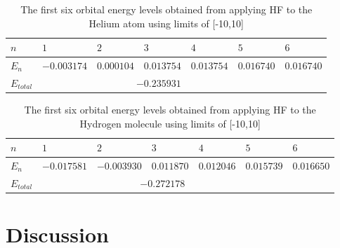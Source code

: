 \documentclass[10pt, oneside, letterpaper]{article}
\begin{document}
\begin{table}[H]
\begin{center}
\begin{tabular}{l|llllll}\hline
$n$    & $1$    & $2$     & $3$     & $4$      & $5$      & $6$      \\\hline
$E_n$  & $-0.003174$  & $0.000104$  & $0.013754$  & $0.013754$  & $0.016740$  & $0.016740$ \\\hline
$E_{total}$ & \multicolumn{5}{c}{$-0.235931$} \\\hline
\end{tabular}
\end{center}
  \caption{The first six orbital energy levels obtained from applying HF to the Helium atom using limits of [-10,10]}
  \label{orbital-energies-he-l10}
\end{table}

\begin{table}[H]
\begin{center}
\begin{tabular}{l|llllll}\hline
$n$    & $1$    & $2$     & $3$     & $4$      & $5$      & $6$      \\\hline
$E_n$  & $-0.017581$  & $-0.003930$  & $0.011870$  & $0.012046$  & $0.015739$  & $0.016650$ \\\hline
$E_{total}$ & \multicolumn{5}{c}{$-0.272178$} \\\hline
\end{tabular}
\end{center}
  \caption{The first six orbital energy levels obtained from applying HF to the Hydrogen molecule using limits of [-10,10]}
  \label{orbital-energies-h2-l10}
\end{table}


\newpage
\section{Discussion}
\end{document}
